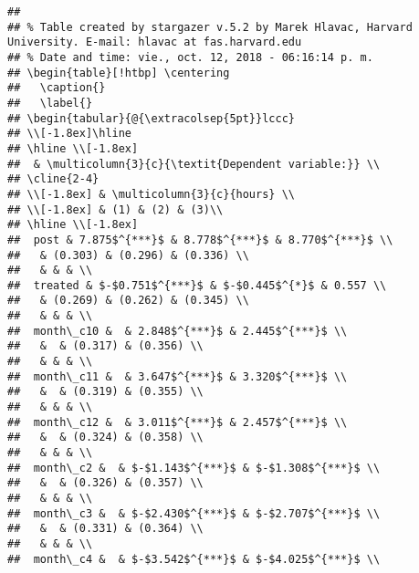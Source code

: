 \documentclass[11pt,]{article}
\begin{document}
\begin{verbatim}
## 
## % Table created by stargazer v.5.2 by Marek Hlavac, Harvard University. E-mail: hlavac at fas.harvard.edu
## % Date and time: vie., oct. 12, 2018 - 06:16:14 p. m.
## \begin{table}[!htbp] \centering 
##   \caption{} 
##   \label{} 
## \begin{tabular}{@{\extracolsep{5pt}}lccc} 
## \\[-1.8ex]\hline 
## \hline \\[-1.8ex] 
##  & \multicolumn{3}{c}{\textit{Dependent variable:}} \\ 
## \cline{2-4} 
## \\[-1.8ex] & \multicolumn{3}{c}{hours} \\ 
## \\[-1.8ex] & (1) & (2) & (3)\\ 
## \hline \\[-1.8ex] 
##  post & 7.875$^{***}$ & 8.778$^{***}$ & 8.770$^{***}$ \\ 
##   & (0.303) & (0.296) & (0.336) \\ 
##   & & & \\ 
##  treated & $-$0.751$^{***}$ & $-$0.445$^{*}$ & 0.557 \\ 
##   & (0.269) & (0.262) & (0.345) \\ 
##   & & & \\ 
##  month\_c10 &  & 2.848$^{***}$ & 2.445$^{***}$ \\ 
##   &  & (0.317) & (0.356) \\ 
##   & & & \\ 
##  month\_c11 &  & 3.647$^{***}$ & 3.320$^{***}$ \\ 
##   &  & (0.319) & (0.355) \\ 
##   & & & \\ 
##  month\_c12 &  & 3.011$^{***}$ & 2.457$^{***}$ \\ 
##   &  & (0.324) & (0.358) \\ 
##   & & & \\ 
##  month\_c2 &  & $-$1.143$^{***}$ & $-$1.308$^{***}$ \\ 
##   &  & (0.326) & (0.357) \\ 
##   & & & \\ 
##  month\_c3 &  & $-$2.430$^{***}$ & $-$2.707$^{***}$ \\ 
##   &  & (0.331) & (0.364) \\ 
##   & & & \\ 
##  month\_c4 &  & $-$3.542$^{***}$ & $-$4.025$^{***}$ \\ 

\end{verbatim}
\end{document}
